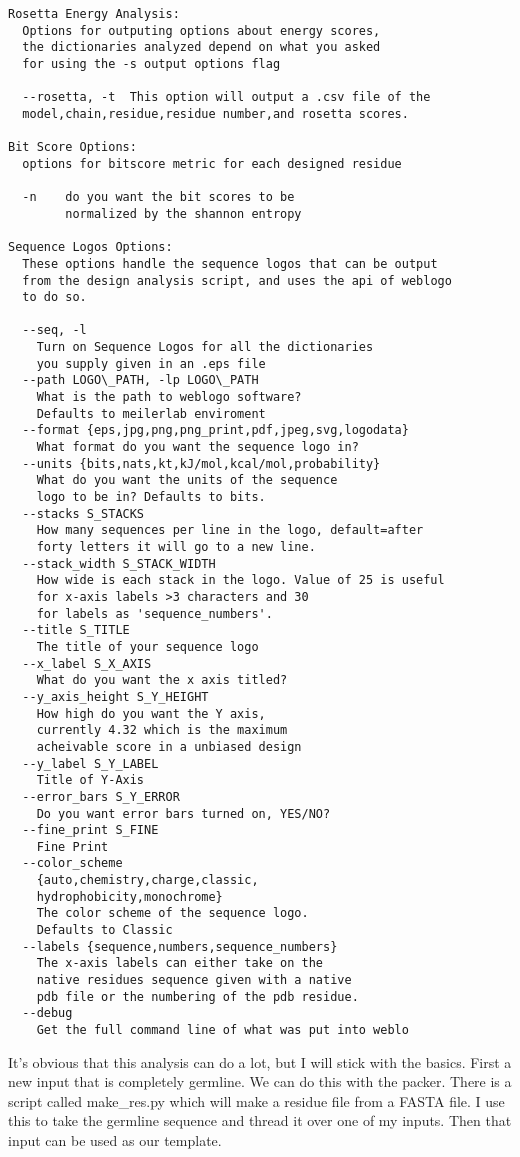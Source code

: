\begin{lstlisting}
Rosetta Energy Analysis:
  Options for outputing options about energy scores,
  the dictionaries analyzed depend on what you asked
  for using the -s output options flag

  --rosetta, -t  This option will output a .csv file of the
  model,chain,residue,residue number,and rosetta scores.

Bit Score Options:
  options for bitscore metric for each designed residue

  -n    do you want the bit scores to be
        normalized by the shannon entropy

Sequence Logos Options:
  These options handle the sequence logos that can be output
  from the design analysis script, and uses the api of weblogo
  to do so.

  --seq, -l
    Turn on Sequence Logos for all the dictionaries
    you supply given in an .eps file
  --path LOGO\_PATH, -lp LOGO\_PATH
    What is the path to weblogo software?
    Defaults to meilerlab enviroment
  --format {eps,jpg,png,png_print,pdf,jpeg,svg,logodata}
    What format do you want the sequence logo in?
  --units {bits,nats,kt,kJ/mol,kcal/mol,probability}
    What do you want the units of the sequence
    logo to be in? Defaults to bits.
  --stacks S_STACKS
    How many sequences per line in the logo, default=after
    forty letters it will go to a new line.
  --stack_width S_STACK_WIDTH
    How wide is each stack in the logo. Value of 25 is useful
    for x-axis labels >3 characters and 30
    for labels as 'sequence_numbers'.
  --title S_TITLE
    The title of your sequence logo
  --x_label S_X_AXIS
    What do you want the x axis titled?
  --y_axis_height S_Y_HEIGHT
    How high do you want the Y axis,
    currently 4.32 which is the maximum
    acheivable score in a unbiased design
  --y_label S_Y_LABEL
    Title of Y-Axis
  --error_bars S_Y_ERROR
    Do you want error bars turned on, YES/NO?
  --fine_print S_FINE
    Fine Print
  --color_scheme
    {auto,chemistry,charge,classic,
    hydrophobicity,monochrome}
    The color scheme of the sequence logo.
    Defaults to Classic
  --labels {sequence,numbers,sequence_numbers}
    The x-axis labels can either take on the
    native residues sequence given with a native
    pdb file or the numbering of the pdb residue.
  --debug
    Get the full command line of what was put into weblo
\end{lstlisting}

It's obvious that this analysis can do a lot, but I will stick with the basics. First a new input that is completely germline. We can do this with the packer.
There is a script called make\_res.py which will make a residue file from a FASTA file. I use this to take the germline sequence and thread it over one of my inputs. Then that input can be used as our template.


